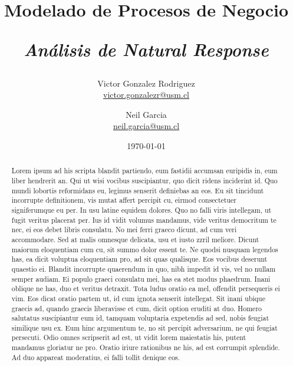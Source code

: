 \documentclass[12pt,letterpaper]{article}
\begin{document}
\begin{titlepage}
\title{Modelado de Procesos de Negocio \\ \begin{Large}\it Análisis de Natural Response\end{Large}} 
\author{Victor Gonzalez Rodriguez\\\url{victor.gonzalezr@usm.cl} \\
\and Neil Garcia\\\url{neil.garcia@usm.cl}}
\date{\today}
\maketitle
\begin{abstract}
Lorem ipsum ad his scripta blandit partiendo, eum fastidii accumsan euripidis in, eum liber hendrerit an. Qui ut wisi vocibus suscipiantur, quo dicit ridens inciderint id. Quo mundi lobortis reformidans eu, legimus senserit definiebas an eos. Eu sit tincidunt incorrupte definitionem, vis mutat affert percipit cu, eirmod consectetuer signiferumque eu per. In usu latine equidem dolores. Quo no falli viris intellegam, ut fugit veritus placerat per. Ius id vidit volumus mandamus, vide veritus democritum te nec, ei eos debet libris consulatu. No mei ferri graeco dicunt, ad cum veri accommodare. Sed at malis omnesque delicata, usu et iusto zzril meliore. Dicunt maiorum eloquentiam cum cu, sit summo dolor essent te. Ne quodsi nusquam legendos has, ea dicit voluptua eloquentiam pro, ad sit quas qualisque. Eos vocibus deserunt quaestio ei. Blandit incorrupte quaerendum in quo, nibh impedit id vis, vel no nullam semper audiam. Ei populo graeci consulatu mei, has ea stet modus phaedrum. Inani oblique ne has, duo et veritus detraxit. Tota ludus oratio ea mel, offendit persequeris ei vim. Eos dicat oratio partem ut, id cum ignota senserit intellegat. Sit inani ubique graecis ad, quando graecis liberavisse et cum, dicit option eruditi at duo. Homero salutatus suscipiantur eum id, tamquam voluptaria expetendis ad sed, nobis feugiat similique usu ex. Eum hinc argumentum te, no sit percipit adversarium, ne qui feugiat persecuti. Odio omnes scripserit ad est, ut vidit lorem maiestatis his, putent mandamus gloriatur ne pro. Oratio iriure rationibus ne his, ad est corrumpit splendide. Ad duo appareat moderatius, ei falli tollit denique eos.
\end{abstract}
\end{titlepage}
\newpage
\tableofcontents
\end{document}
